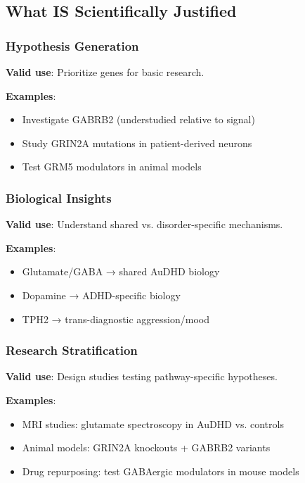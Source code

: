 \documentclass[12pt,letterpaper]{article}
\begin{document}
\subsection{What IS Scientifically Justified}

\subsubsection{Hypothesis Generation}

\textbf{Valid use}: Prioritize genes for basic research.

\textbf{Examples}:
\begin{itemize}
    \item Investigate GABRB2 (understudied relative to signal)
    \item Study GRIN2A mutations in patient-derived neurons
    \item Test GRM5 modulators in animal models
\end{itemize}

\subsubsection{Biological Insights}

\textbf{Valid use}: Understand shared vs. disorder-specific mechanisms.

\textbf{Examples}:
\begin{itemize}
    \item Glutamate/GABA → shared AuDHD biology
    \item Dopamine → ADHD-specific biology
    \item TPH2 → trans-diagnostic aggression/mood
\end{itemize}

\subsubsection{Research Stratification}

\textbf{Valid use}: Design studies testing pathway-specific hypotheses.

\textbf{Examples}:
\begin{itemize}
    \item MRI studies: glutamate spectroscopy in AuDHD vs. controls
    \item Animal models: GRIN2A knockouts + GABRB2 variants
    \item Drug repurposing: test GABAergic modulators in mouse models
\end{itemize}
\end{document}
